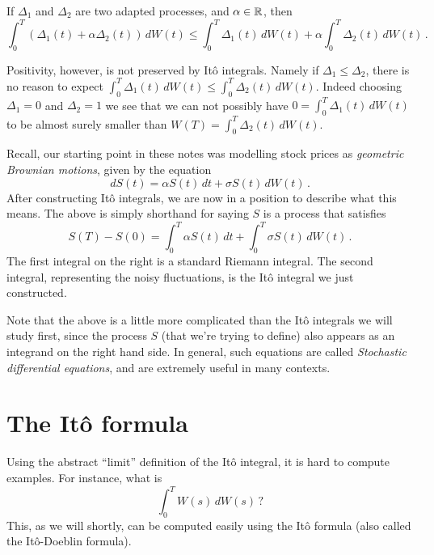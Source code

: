 \begin{proposition}[Linearity]
  If $\Delta_1$ and $\Delta_2$ are two adapted processes, and $\alpha \in \mathbb{R}$, then
  \begin{equation*}
    \int_0^T (\Delta_1(t) + \alpha \Delta_2(t)) \, dW(t) 
      \leq \int_0^T \Delta_1(t) \, dW(t) + \alpha \int_0^T \Delta_2(t) \, dW(t)\,.
  \end{equation*}
\end{proposition}
\begin{remark}
  Positivity, however, is not preserved by It\^o integrals.
  Namely if $\Delta_1 \leq \Delta_2$, there is no reason to expect $\int_0^T \Delta_1(t) \, dW(t) \leq \int_0^T \Delta_2(t) \, dW(t)$.
  Indeed choosing $\Delta_1 = 0$ and $\Delta_2 = 1$ we see that we can not possibly have $0 = \int_0^T \Delta_1(t) \, dW(t)$ to be almost surely smaller than $W(T) = \int_0^T \Delta_2(t) \, dW(t)$.
\end{remark}


Recall, our starting point in these notes was modelling stock prices as \emph{geometric Brownian motions}, given by the equation
\begin{equation*}
  dS(t) = \alpha S(t) \, dt + \sigma S(t) \, dW(t)\,.
\end{equation*}
After constructing It\^o integrals, we are now in a position to describe what this means.
The above is simply shorthand for saying $S$ is a process that satisfies
\begin{equation*}
  S(T) - S(0) = \int_0^T \alpha S(t) \, dt + \int_0^T \sigma S(t) \, dW(t)\,.
\end{equation*}
The first integral on the right is a standard Riemann integral.
The second integral, representing the noisy fluctuations, is the It\^o integral we just constructed.

Note that the above is a little more complicated than the It\^o integrals we will study first, since the process $S$ (that we're trying to define) also appears as an integrand on the right hand side.
In general, such equations are called \emph{Stochastic differential equations}, and are extremely useful in many contexts.

\section{The It\^o formula}

Using the abstract ``limit'' definition of the It\^o integral, it is hard to compute examples.
For instance, what is
\begin{equation*}
  \int_0^T W(s) \, dW(s) \,?
\end{equation*}
This, as we will shortly, can be computed easily using the It\^o formula (also called the It\^o-Doeblin formula).

